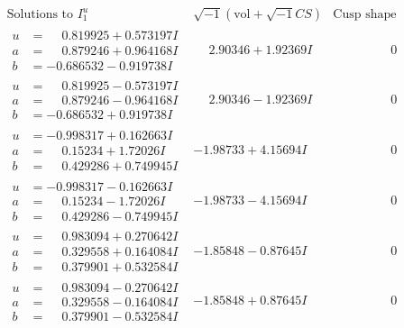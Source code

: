 \documentclass[1p]{elsarticle_modified}
\theoremstyle{definition}
\newcommand{\I}{\sqrt{-1}}
\begin{document}
$$\begin{array}{c|c|c}  
\text{Solutions to }I^u_{1}& \I (\text{vol} + \sqrt{-1}CS) & \text{Cusp shape}\\
 \hline 
\begin{aligned}
u &= \phantom{-}0.819925 + 0.573197 I \\
a &= \phantom{-}0.879246 + 0.964168 I \\
b &= -0.686532 - 0.919738 I\end{aligned}
 & \phantom{-}2.90346 + 1.92369 I & \phantom{-0.000000 } 0 \\ \hline\begin{aligned}
u &= \phantom{-}0.819925 - 0.573197 I \\
a &= \phantom{-}0.879246 - 0.964168 I \\
b &= -0.686532 + 0.919738 I\end{aligned}
 & \phantom{-}2.90346 - 1.92369 I & \phantom{-0.000000 } 0 \\ \hline\begin{aligned}
u &= -0.998317 + 0.162663 I \\
a &= \phantom{-}0.15234 + 1.72026 I \\
b &= \phantom{-}0.429286 + 0.749945 I\end{aligned}
 & -1.98733 + 4.15694 I & \phantom{-0.000000 } 0 \\ \hline\begin{aligned}
u &= -0.998317 - 0.162663 I \\
a &= \phantom{-}0.15234 - 1.72026 I \\
b &= \phantom{-}0.429286 - 0.749945 I\end{aligned}
 & -1.98733 - 4.15694 I & \phantom{-0.000000 } 0 \\ \hline\begin{aligned}
u &= \phantom{-}0.983094 + 0.270642 I \\
a &= \phantom{-}0.329558 + 0.164084 I \\
b &= \phantom{-}0.379901 + 0.532584 I\end{aligned}
 & -1.85848 - 0.87645 I & \phantom{-0.000000 } 0 \\ \hline\begin{aligned}
u &= \phantom{-}0.983094 - 0.270642 I \\
a &= \phantom{-}0.329558 - 0.164084 I \\
b &= \phantom{-}0.379901 - 0.532584 I\end{aligned}
 & -1.85848 + 0.87645 I & \phantom{-0.000000 } 0 \\ \hline\begin{aligned}

\end{aligned}
\end{array}$$
\end{document}
